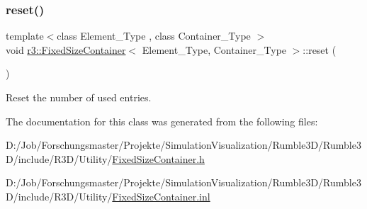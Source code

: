\subsubsection{\texorpdfstring{reset()}{reset()}}
{\footnotesize\ttfamily template$<$class Element\+\_\+\+Type , class Container\+\_\+\+Type $>$ \\
void \mbox{\hyperlink{classr3_1_1_fixed_size_container}{r3\+::\+Fixed\+Size\+Container}}$<$ Element\+\_\+\+Type, Container\+\_\+\+Type $>$\+::reset (\begin{DoxyParamCaption}{ }\end{DoxyParamCaption})}



Reset the number of used entries. 



The documentation for this class was generated from the following files\+:\begin{DoxyCompactItemize}
\item 
D\+:/\+Job/\+Forschungsmaster/\+Projekte/\+Simulation\+Visualization/\+Rumble3\+D/\+Rumble3\+D/include/\+R3\+D/\+Utility/\mbox{\hyperlink{_fixed_size_container_8h}{Fixed\+Size\+Container.\+h}}\item 
D\+:/\+Job/\+Forschungsmaster/\+Projekte/\+Simulation\+Visualization/\+Rumble3\+D/\+Rumble3\+D/include/\+R3\+D/\+Utility/\mbox{\hyperlink{_fixed_size_container_8inl}{Fixed\+Size\+Container.\+inl}}\end{DoxyCompactItemize}
